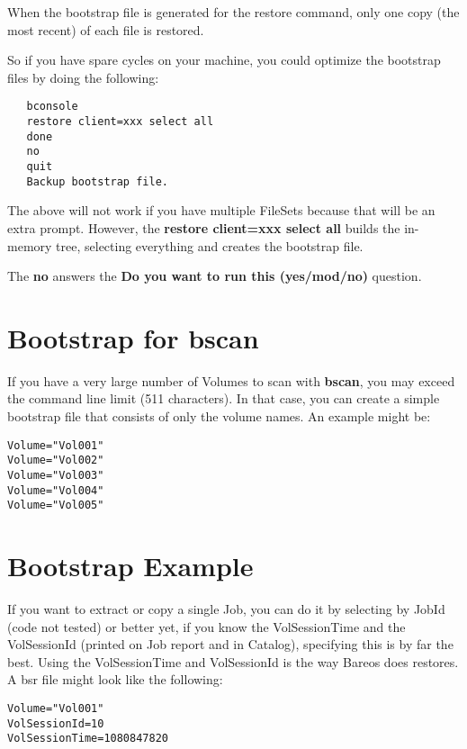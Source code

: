 When the bootstrap file is generated for the restore command, only one copy
(the most recent) of each file is restored.

So if you have spare cycles on your machine, you could optimize the bootstrap
files by doing the following:

\footnotesize
\begin{verbatim}
   bconsole
   restore client=xxx select all
   done
   no
   quit
   Backup bootstrap file.
\end{verbatim}
\normalsize

The above will not work if you have multiple FileSets because that will be an
extra prompt. However, the {\bf restore client=xxx select all} builds the
in-memory tree, selecting everything and creates the bootstrap file.

The {\bf no} answers the {\bf Do you want to run this (yes/mod/no)} question.

\section{Bootstrap for bscan}
\label{bscanBootstrap}

If you have a very large number of Volumes to scan with {\bf bscan},
you may exceed the command line limit (511 characters). In that case,
you can create a simple bootstrap file that consists of only the
volume names.  An example might be:

\footnotesize
\begin{verbatim}
Volume="Vol001"
Volume="Vol002"
Volume="Vol003"
Volume="Vol004"
Volume="Vol005"
\end{verbatim}
\normalsize


\section{Bootstrap Example}


If you want to extract or copy a single Job, you can do it by selecting by
JobId (code not tested) or better yet, if you know the VolSessionTime and the
VolSessionId (printed on Job report and in Catalog), specifying this is by far
the best. Using the VolSessionTime and VolSessionId is the way Bareos does
restores. A bsr file might look like the following:

\footnotesize
\begin{verbatim}
Volume="Vol001"
VolSessionId=10
VolSessionTime=1080847820
\end{verbatim}
\normalsize

